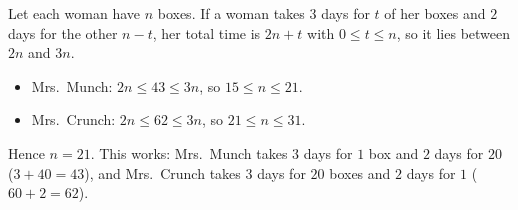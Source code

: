 Let each woman have $n$ boxes. If a woman takes $3$ days for $t$ of her boxes and $2$ days for the other $n-t$, her total time is $2n+t$ with $0\le t\le n$, so it lies between $2n$ and $3n$.
\begin{itemize}
\item Mrs.\ Munch: $2n\le43\le3n$, so $15\le n\le21$.
\item Mrs.\ Crunch: $2n\le62\le3n$, so $21\le n\le31$.
\end{itemize}
Hence $n=\boxed{21}$. This works: Mrs.\ Munch takes $3$ days for $1$ box and $2$ days for $20$ ($3+40=43$), and Mrs.\ Crunch takes $3$ days for $20$ boxes and $2$ days for $1$ ($60+2=62$).
